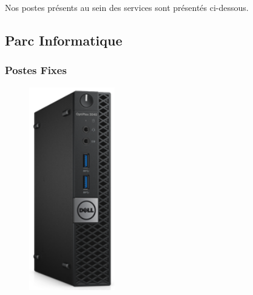 \documentclass[11pt,a4paper,oneside]{article}
\begin{document}
Nos postes présents au sein des services sont présentés ci-dessous.\\
\newpage
\newpage
\subsection{Parc Informatique}
\subsubsection{Postes Fixes}
\begin{figure}
\includegraphics[scale=0.4]{Ressources/Materiel/3040.png}\vspace{-2cm}
\end{figure}
\end{document}
